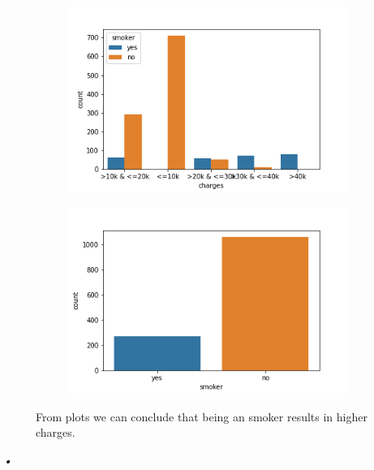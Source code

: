 \documentclass[12pt]{article}
\begin{document}
\begin{figure}[H]
\centering
\begin{subfigure}{0.5\textwidth}
\includegraphics[width=\textwidth]{smoker.png}
\end{subfigure}
\begin{subfigure}{0.5\textwidth}
\includegraphics[width=\textwidth]{smoker_dist.png}
\end{subfigure}
\label{mesh:fig1}
\caption{From plots we can conclude that being an smoker results in higher charges.}
\end{figure}\textit{•}
\end{document}
